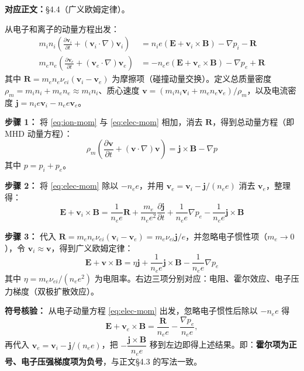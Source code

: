 \documentclass[12pt,a4paper,openany,oneside]{book}
\newcommand{\vect}[1]{\bm{#1}}
\newcommand{\grad}{\nabla}
\begin{document}
\textbf{对应正文：}\S 4.4（广义欧姆定律）。

从电子和离子的动量方程出发：
\begin{align}
m_i n_i \left(\frac{\partial \vect{v}_i}{\partial t} + (\vect{v}_i\cdot\grad)\vect{v}_i\right) &= n_i e(\vect{E}+\vect{v}_i\times\vect{B}) - \grad p_i - \vect{R} \label{eq:ion-mom}\\
m_e n_e \left(\frac{\partial \vect{v}_e}{\partial t} + (\vect{v}_e\cdot\grad)\vect{v}_e\right) &= -n_e e(\vect{E}+\vect{v}_e\times\vect{B}) - \grad p_e + \vect{R} \label{eq:elec-mom}
\end{align}
其中 $\vect{R}=m_e n_e \nu_{ei}(\vect{v}_i-\vect{v}_e)$ 为摩擦项（碰撞动量交换）。定义总质量密度 $\rho_m=m_i n_i+m_e n_e\approx m_i n_i$、质心速度 $\vect{v}=(m_i n_i\vect{v}_i+m_e n_e\vect{v}_e)/\rho_m$，以及电流密度 $\vect{j}=n_i e\vect{v}_i-n_e e\vect{v}_e$。

\textbf{步骤 1：} 将 \eqref{eq:ion-mom} 与 \eqref{eq:elec-mom} 相加，消去 $\vect{R}$，得到总动量方程（即 MHD 动量方程）：
\begin{equation}
\rho_m \left(\frac{\partial \vect{v}}{\partial t} + (\vect{v}\cdot\grad)\vect{v}\right) = \vect{j}\times\vect{B} - \grad p
\label{eq:ch9-mhd-momentum}
\end{equation}
其中 $p=p_i+p_e$。

\textbf{步骤 2：} 将 \eqref{eq:elec-mom} 除以 $-n_e e$，并用 $\vect{v}_e = \vect{v}_i - \vect{j}/(n_e e)$ 消去 $\vect{v}_e$，整理得：
\begin{equation}
\vect{E} + \vect{v}_i\times\vect{B} = \frac{1}{n_e e}\vect{R} + \frac{m_e}{n_e e^2}\frac{\partial \vect{j}}{\partial t} + \frac{1}{n_e e}\grad p_e - \frac{1}{n_e e}\vect{j}\times\vect{B}
\label{eq:ch9-generalized-ohm}
\end{equation}

\textbf{步骤 3：} 代入 $\vect{R}=m_e n_e \nu_{ei}(\vect{v}_i-\vect{v}_e)=m_e \nu_{ei}\vect{j}/e$，并忽略电子惯性项（$m_e\to 0$），令 $\vect{v}_i\approx\vect{v}$，得到广义欧姆定律：
\begin{equation}
\boxed{
\vect{E} + \vect{v}\times\vect{B} = \eta\vect{j} + \frac{1}{n_e e}\vect{j}\times\vect{B} - \frac{1}{n_e e}\grad p_e
}
\label{eq:ch9-generalized-ohm-simplified}
\end{equation}
其中 $\eta=m_e\nu_{ei}/(n_e e^2)$ 为电阻率。右边三项分别对应：电阻、霍尔效应、电子压力梯度（双极扩散效应）。

\textbf{符号核验：} 从电子动量方程 \eqref{eq:elec-mom} 出发，忽略电子惯性后除以 $-n_ee$ 得
\[
\vect{E}+\vect{v}_e\times\vect{B} = \frac{\vect{R}}{n_ee} - \frac{\grad p_e}{n_ee},
\]
再代入 $\vect{v}_e=\vect{v}_i-\vect{j}/(n_ee)$，把 $-\dfrac{\vect{j}\times\vect{B}}{n_ee}$ 移到左边即得上述结果。即：\textbf{霍尔项为正号、电子压强梯度项为负号}，与正文\S 4.3 的写法一致。
\end{document}
